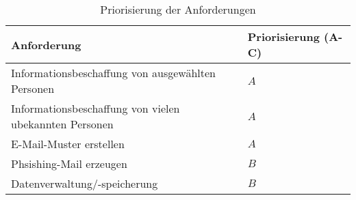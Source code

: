 \begin{table}
	\caption{Priorisierung der Anforderungen}
	\label{tab:prio}
	\begin{center} 
		\begin{tabular}{|l|l|}
			\hline
			Anforderung & Priorisierung (A-C) \\
			\hline
			Informationsbeschaffung von ausgewählten Personen & $ A $ \\
			\hline
			Informationsbeschaffung von vielen ubekannten Personen & $ A $ \\
			\hline
			E-Mail-Muster erstellen & $ A $		\\
			\hline
			Phsishing-Mail erzeugen & $ B $ 	\\
			\hline
			Datenverwaltung/-speicherung & $ B $   \\
			\hline
		\end{tabular}
	\end{center}
\end{table}
